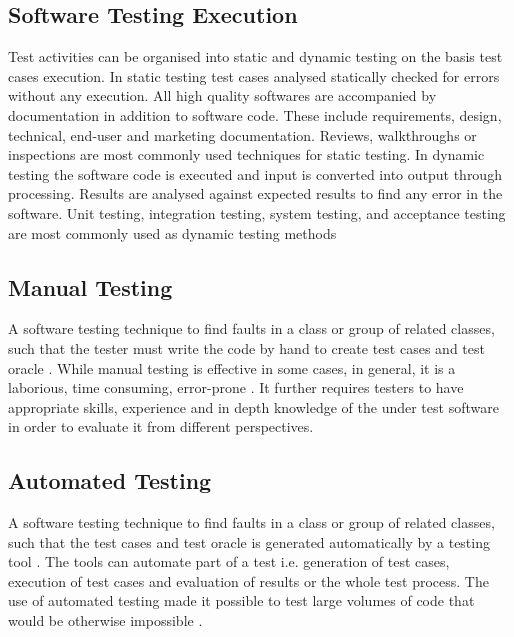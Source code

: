 \subsection{Software Testing Execution}
Test activities can be organised into static and dynamic testing on the basis test cases execution. In static testing test cases analysed statically checked for errors without any execution. All high quality softwares are accompanied by documentation in addition to software code. These include requirements, design, technical, end-user and marketing documentation. Reviews, walkthroughs or inspections are most commonly used techniques for static testing. In dynamic testing the software code is executed and input is converted into output through processing. Results are analysed against expected results to find any error in the software. Unit testing, integration testing, system testing, and acceptance testing are most commonly used as dynamic testing methods \cite{fairley1978tutorial}




\subsection{Manual Testing}
 A software testing technique to find faults in a class or group of related classes, such that the tester must write the code by hand to create test cases and test oracle \cite{Ciupa2008}. While manual testing is effective in some cases, in general, it is a laborious, time consuming, error-prone \cite{tretmans1999}. It further requires testers to have appropriate skills, experience and in depth knowledge of the under test software in order to evaluate it from different perspectives.
 
\subsection{Automated Testing}
A software testing technique to find faults in a class or group of related classes, such that the test cases and test oracle is generated automatically by a testing tool \cite{Leitner2007}. The tools can automate part of a test i.e. generation of test cases, execution of test cases and evaluation of results or the whole test process. The use of automated testing made it possible to test large volumes of code that would be otherwise impossible \cite{ramamoorthy1975}.

